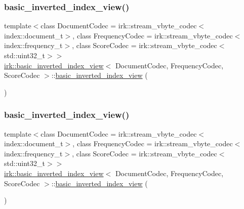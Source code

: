 \subsubsection{\texorpdfstring{basic\+\_\+inverted\+\_\+index\+\_\+view()}{basic\_inverted\_index\_view()}\hspace{0.1cm}{\footnotesize\ttfamily [1/4]}}
{\footnotesize\ttfamily template$<$class Document\+Codec  = irk\+::stream\+\_\+vbyte\+\_\+codec$<$index\+::document\+\_\+t$>$, class Frequency\+Codec  = irk\+::stream\+\_\+vbyte\+\_\+codec$<$index\+::frequency\+\_\+t$>$, class Score\+Codec  = irk\+::stream\+\_\+vbyte\+\_\+codec$<$std\+::uint32\+\_\+t$>$$>$ \\
\mbox{\hyperlink{classirk_1_1basic__inverted__index__view}{irk\+::basic\+\_\+inverted\+\_\+index\+\_\+view}}$<$ Document\+Codec, Frequency\+Codec, Score\+Codec $>$\+::\mbox{\hyperlink{classirk_1_1basic__inverted__index__view}{basic\+\_\+inverted\+\_\+index\+\_\+view}} (\begin{DoxyParamCaption}{ }\end{DoxyParamCaption})\hspace{0.3cm}{\ttfamily [delete]}}

\mbox{\label{classirk_1_1basic__inverted__index__view_ab8a6c43523b96e95044bb68e6fdfd54a}} 
\subsubsection{\texorpdfstring{basic\+\_\+inverted\+\_\+index\+\_\+view()}{basic\_inverted\_index\_view()}\hspace{0.1cm}{\footnotesize\ttfamily [2/4]}}
{\footnotesize\ttfamily template$<$class Document\+Codec  = irk\+::stream\+\_\+vbyte\+\_\+codec$<$index\+::document\+\_\+t$>$, class Frequency\+Codec  = irk\+::stream\+\_\+vbyte\+\_\+codec$<$index\+::frequency\+\_\+t$>$, class Score\+Codec  = irk\+::stream\+\_\+vbyte\+\_\+codec$<$std\+::uint32\+\_\+t$>$$>$ \\
\mbox{\hyperlink{classirk_1_1basic__inverted__index__view}{irk\+::basic\+\_\+inverted\+\_\+index\+\_\+view}}$<$ Document\+Codec, Frequency\+Codec, Score\+Codec $>$\+::\mbox{\hyperlink{classirk_1_1basic__inverted__index__view}{basic\+\_\+inverted\+\_\+index\+\_\+view}} (\begin{DoxyParamCaption}\item[{const \mbox{\hyperlink{classirk_1_1basic__inverted__index__view}{basic\+\_\+inverted\+\_\+index\+\_\+view}}$<$ Document\+Codec, Frequency\+Codec, Score\+Codec $>$ \&}]{ }\end{DoxyParamCaption})\hspace{0.3cm}{\ttfamily [default]}}

